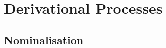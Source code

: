 \documentclass[grammar]{subfiles}
\begin{document}
	\chapter{Derivational Processes}
	\label{ch:derivation}

	\section{Nominalisation}
	\label{sec:dev_nominalisation}
\end{document}

